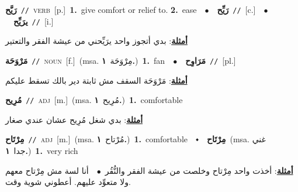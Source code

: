 \documentclass[10pt,a4paper,twoside]{article} %
\begin{document}
\begin{multicols}{2}
{\setlength\topsep{0pt}\textbf{\foreignlanguage{arabic}{رَيَّح}}\ {\color{gray}\texttt{//}\color{black}}\ \textsc{verb}\ [p.]\ \textbf{1.}~give comfort or relief to.  \textbf{2.}~ease\ \ $\bullet$\ \ \setlength\topsep{0pt}\textbf{\foreignlanguage{arabic}{رَيِّح}}\ {\color{gray}\texttt{//}\color{black}}\ [c.]\ \ $\bullet$\ \ \setlength\topsep{0pt}\textbf{\foreignlanguage{arabic}{يرَيِّح}}\ {\color{gray}\texttt{//}\color{black}}\ [i.]\  \begin{flushright}\color{gray}\foreignlanguage{arabic}{\textbf{\underline{\foreignlanguage{arabic}{أمثلة}}}: بدي أتجوز واحد يرَيِّحني من عيشة الفقر والتعتير}\end{flushright}\color{black}} \vspace{2mm}

{\setlength\topsep{0pt}\textbf{\foreignlanguage{arabic}{مَرْوَحَة}}\ {\color{gray}\texttt{//}\color{black}}\ \textsc{noun}\ [f.]\ \color{gray}(msa. \foreignlanguage{arabic}{مِرْوَحَة}~\foreignlanguage{arabic}{\textbf{١.}})\color{black}\ \textbf{1.}~fan\ \ $\bullet$\ \ \setlength\topsep{0pt}\textbf{\foreignlanguage{arabic}{مَرَاوِح}}\ {\color{gray}\texttt{//}\color{black}}\ [pl.]\  \begin{flushright}\color{gray}\foreignlanguage{arabic}{\textbf{\underline{\foreignlanguage{arabic}{أمثلة}}}: مَرْوَحَة السقف مش ثابتة دير بالك تسقط عليكم}\end{flushright}\color{black}} \vspace{2mm}

{\setlength\topsep{0pt}\textbf{\foreignlanguage{arabic}{مُرِيح}}\ {\color{gray}\texttt{//}\color{black}}\ \textsc{adj}\ [m.]\ \color{gray}(msa. \foreignlanguage{arabic}{مُرِيح}~\foreignlanguage{arabic}{\textbf{١.}})\color{black}\ \textbf{1.}~comfortable\  \begin{flushright}\color{gray}\foreignlanguage{arabic}{\textbf{\underline{\foreignlanguage{arabic}{أمثلة}}}: بدي شغل مُرِيح عشان عندي صغار}\end{flushright}\color{black}} \vspace{2mm}

{\setlength\topsep{0pt}\textbf{\foreignlanguage{arabic}{مِرْتَاح}}\ {\color{gray}\texttt{//}\color{black}}\ \textsc{adj}\ [m.]\ \color{gray}(msa. \foreignlanguage{arabic}{مُرْتاح}~\foreignlanguage{arabic}{\textbf{١.}})\color{black}\ \textbf{1.}~comfortable\ \ $\smblkdiamond$\ \ \setlength\topsep{0pt}\textbf{\foreignlanguage{arabic}{مِرْتَاح}}\ \color{gray}(msa. \foreignlanguage{arabic}{غني جدا}~\foreignlanguage{arabic}{\textbf{١.}})\color{black}\ \textbf{1.}~very rich\  \begin{flushright}\color{gray}\foreignlanguage{arabic}{\textbf{\underline{\foreignlanguage{arabic}{أمثلة}}}: أخذت واحد مِرْتاح وخلصت من عيشة الفقر والنُّقُر\ $\bullet$\ \  أنا لسة مش مِرْتاح معهم ولا متعوِّد عليهم. أعطوني شوية وقت.}\end{flushright}\color{black}} \vspace{2mm}


\end{multicols}
\end{document}
